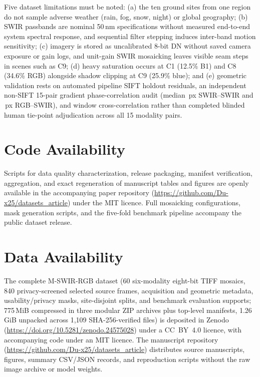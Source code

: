 \documentclass[a4paper,10pt]{article}
\begin{document}
Five dataset limitations must be noted: (a) the ten ground sites from one region do not sample adverse weather (rain, fog, snow, night) or global geography; (b) SWIR passbands are nominal 50\,nm specifications without measured end-to-end system spectral response, and sequential filter stepping induces inter-band motion sensitivity; (c) imagery is stored as uncalibrated 8-bit DN without saved camera exposure or gain logs, and unit-gain SWIR mosaicking leaves visible seam steps in scenes such as C9; (d) heavy saturation occurs at C1 (12.5\% B1) and C8 (34.6\% RGB) alongside shadow clipping at C9 (25.9\% blue); and (e) geometric validation rests on automated pipeline SIFT holdout residuals, an independent non-SIFT 15-pair gradient phase-correlation audit (median \AuditSwirSwirMed\,px SWIR--SWIR and \AuditRgbSwirMed\,px RGB--SWIR), and window cross-correlation rather than completed blinded human tie-point adjudication across all 15 modality pairs.

\section*{Code Availability}
Scripts for data quality characterization, release packaging, manifest verification, aggregation, and exact regeneration of manuscript tables and figures are openly available in the accompanying paper repository (\url{https://github.com/Du-x25/datasets_article}) under the MIT licence. Full mosaicking configurations, mask generation scripts, and the five-fold benchmark pipeline accompany the public dataset release.

\section*{Data Availability}
The complete M-SWIR-RGB dataset \cite{du2026mswirrgb_data} (60 six-modality eight-bit TIFF mosaics, 840 privacy-screened selected source frames, acquisition and geometric metadata, usability/privacy masks, site-disjoint splits, and benchmark evaluation supports; 775\,MiB compressed in three modular ZIP archives plus top-level manifests, 1.26\,GiB unpacked across 1,109 SHA-256-verified files) is deposited in Zenodo (\url{https://doi.org/10.5281/zenodo.24575028}) under a CC~BY~4.0 licence, with accompanying code under an MIT licence. The manuscript repository (\url{https://github.com/Du-x25/datasets_article}) distributes source manuscripts, figures, summary CSV/JSON records, and reproduction scripts without the raw image archive or model weights.
\end{document}
